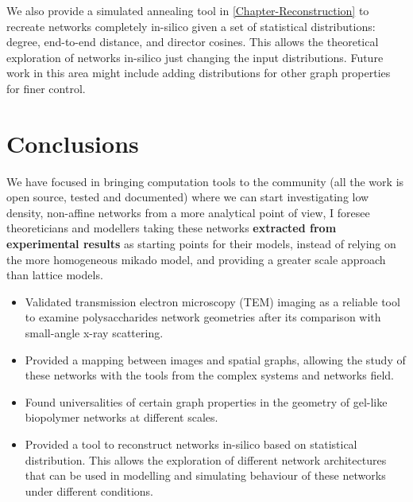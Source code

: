 We also provide a simulated annealing tool in \autoref{Chapter-Reconstruction} to recreate networks completely in-silico given a set of statistical distributions: degree, end-to-end distance, and director cosines. This allows the theoretical exploration of networks in-silico just changing the input distributions. Future work in this area might include adding distributions for other graph properties for finer control.

\section{Conclusions}%
\label{sub:conclusions_conclusions}

We have focused in bringing computation tools to the community (all the work is open source, tested and documented) where we can start investigating low density, non-affine networks from a more analytical point of view, I foresee theoreticians and modellers taking these networks \textbf{extracted from experimental results} as starting points for their models, instead of relying on the more homogeneous mikado model, and providing a greater scale approach than lattice models.

\begin{itemize}[topsep=0pt]
  \item Validated transmission electron microscopy (TEM) imaging as a reliable tool to examine polysaccharides network geometries after its comparison with small-angle x-ray scattering.
  \item Provided a mapping between images and spatial graphs, allowing the study of these networks with the tools from the complex systems and networks field.
  \item Found universalities of certain graph properties in the geometry of gel-like biopolymer networks at different scales.
  \item Provided a tool to reconstruct networks in-silico based on statistical distribution. This allows the exploration of different network architectures that can be used in modelling and simulating behaviour of these networks under different conditions.
\end{itemize}

